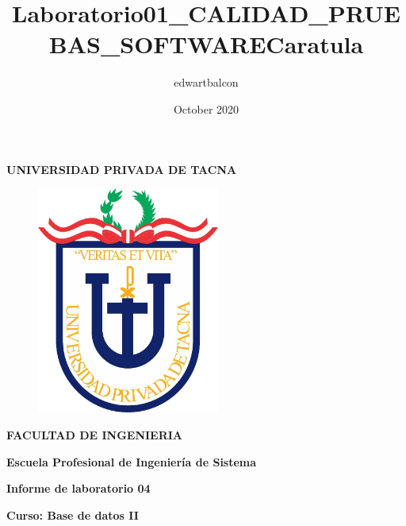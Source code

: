 \documentclass{article}
\title{Laboratorio01_CALIDAD_PRUEBAS_SOFTWARE}
\author{edwartbalcon }
\date{October 2020}
\begin{document}
\title{Caratula}

\begin{titlepage}
\begin{center}
\begin{Large}
\textbf{UNIVERSIDAD PRIVADA DE TACNA} \\
\end{Large}
\vspace*{-0.025in}
\begin{figure}[htb]
\begin{center}
\includegraphics[width=6cm]{./images/logo_UPT}
\end{center}
\end{figure}
\vspace*{-0.025in}
\begin{Large}
\textbf{FACULTAD DE INGENIERIA} \\
\end{Large}
\vspace*{0.05in}
\begin{Large}
\textbf{Escuela Profesional de Ingeniería de Sistema} \\
\end{Large}


\vspace*{0.4in}

\vspace*{0.1in}
\begin{Large}
\textbf{Informe de laboratorio 04} \\
\end{Large}

\vspace*{0.3in}
\begin{Large}
\textbf{Curso: Base de datos II} \\
\end{Large}


\end{center}
\end{titlepage}
\end{document}
